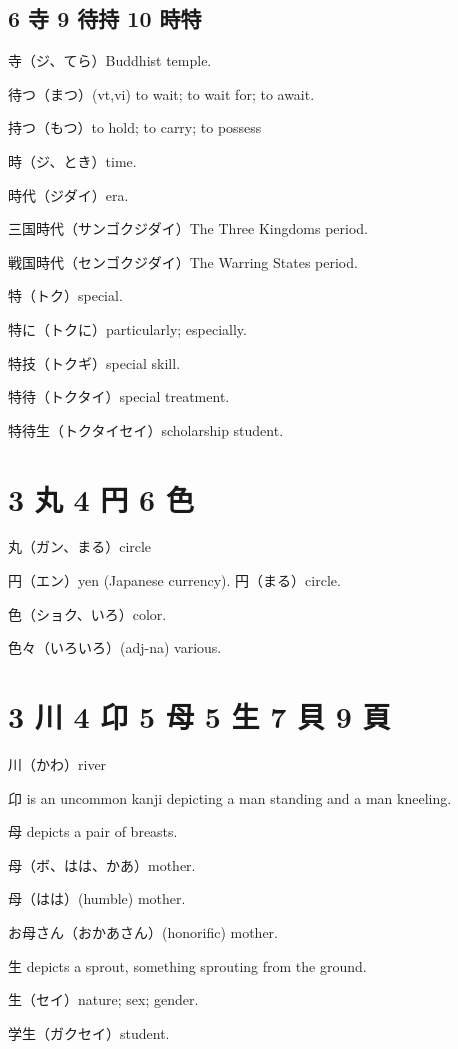 \subsection{6 寺 9 待持 10 時特}

寺（ジ、てら）Buddhist temple.

待つ（まつ）(vt,vi) to wait; to wait for; to await.

持つ（もつ）to hold; to carry; to possess

時（ジ、とき）time.

時代（ジダイ）era.

三国時代（サンゴクジダイ）The Three Kingdoms period.

戦国時代（センゴクジダイ）The Warring States period.

特（トク）special.

特に（トクに）particularly; especially.

特技（トクギ）special skill.

特待（トクタイ）special treatment.

特待生（トクタイセイ）scholarship student.

\section{3 丸 4 円 6 色}

丸（ガン、まる）circle

円（エン）yen (Japanese currency).
円（まる）circle.

色（ショク、いろ）color.

色々（いろいろ）(adj-na) various.

\section{3 川 4 卬 5 母 5 生 7 貝 9 頁}

川（かわ）river

卬 is an uncommon kanji depicting a man standing and a man kneeling.

母 depicts a pair of breasts.

母（ボ、はは、かあ）mother.

母（はは）(humble) mother.

お母さん（おかあさん）(honorific) mother.

生 depicts a sprout, something sprouting from the ground.

生（セイ）nature; sex; gender.

学生（ガクセイ）student.

